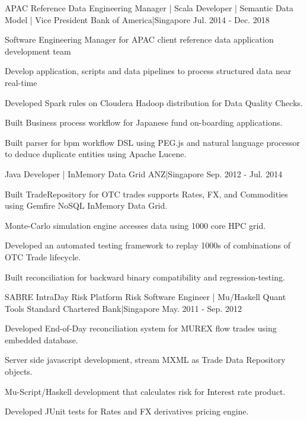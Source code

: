 \begin{cventries}
{    }
    {APAC Reference Data Engineering Manager | Scala Developer | Semantic Data Model | Vice President}
    {Bank of America|Singapore}
    {Jul. 2014 - Dec. 2018}
    {
      \begin{cvitems}
        \item {Software Engineering Manager for APAC client reference data application development team}
        \item {Develop application, scripts and data pipelines to process structured data near real-time}
        \item {Developed Spark rules on Cloudera Hadoop distribution for Data Quality Checks.}
        \item {Built Business process workflow for Japanese fund on-boarding applications.}
        \item {Built parser for bpm workflow DSL using PEG.js and natural language processor to deduce duplicate entities using Apache Lucene.}
      \end{cvitems}
    }
    {Java Developer | InMemory Data Grid}
    {ANZ|Singapore}
    {Sep. 2012 - Jul. 2014}
    {
      \begin{cvitems}
        \item {Built TradeRepository for OTC trades  supports Rates, FX, and Commodities using Gemfire NoSQL InMemory Data Grid.}
        \item {Monte-Carlo simulation engine accesses data using 1000 core HPC grid.}
        \item {Developed an automated testing framework to replay 1000s of combinations of OTC Trade lifecycle.}
        \item {Built reconciliation for backward binary compatibility and regression-testing.}
      \end{cvitems}
    }
  \cventry
    {SABRE IntraDay Risk Platform}
    {Risk Software Engineer | Mu/Haskell Quant Tools}
    {Standard Chartered Bank|Singapore}
    {May. 2011 - Sep. 2012}
    {
      \begin{cvitems}
        \item {Developed End-of-Day reconciliation system for MUREX flow trades using embedded database.}
        \item {Server side javascript development, stream MXML as Trade Data Repository objects.}
        \item {Mu-Script/Haskell development that calculates risk for Interest rate product.}
        \item {Developed JUnit tests for Rates and FX derivatives pricing engine.}

\end{cvitems}}
\end{cventries}
